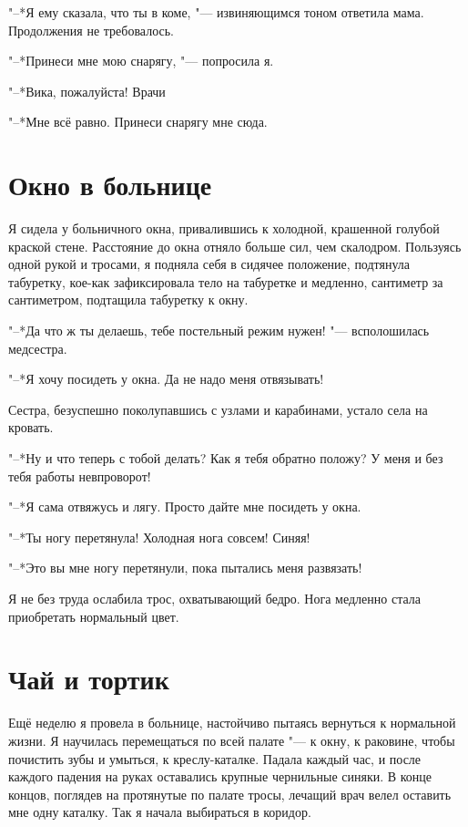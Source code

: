 "--*Я ему сказала, что ты в коме, "--- извиняющимся тоном ответила мама.
Продолжения не требовалось.

"--*Принеси мне мою снарягу, "--- попросила я.

"--*Вика, пожалуйста!
Врачи\ldotst

"--*Мне всё равно.
Принеси снарягу мне сюда.

\section{Окно в больнице}

Я сидела у больничного окна, привалившись к холодной, крашенной голубой краской стене.
Расстояние до окна отняло больше сил, чем скалодром.
Пользуясь одной рукой и тросами, я подняла себя в сидячее положение, подтянула табуретку, кое-как зафиксировала тело на табуретке и медленно, сантиметр за сантиметром, подтащила табуретку к окну.

"--*Да что ж ты делаешь, тебе постельный режим нужен! "--- всполошилась медсестра.

"--*Я хочу посидеть у окна.
Да не надо меня отвязывать!

Сестра, безуспешно поколупавшись с узлами и карабинами, устало села на кровать.

"--*Ну и что теперь с тобой делать?
Как я тебя обратно положу?
У меня и без тебя работы невпроворот!

"--*Я сама отвяжусь и лягу.
Просто дайте мне посидеть у окна.

"--*Ты ногу перетянула!
Холодная нога совсем!
Синяя!

"--*Это вы мне ногу перетянули, пока пытались меня развязать!

Я не без труда ослабила трос, охватывающий бедро.
Нога медленно стала приобретать нормальный цвет.

\section{Чай и тортик}

Ещё неделю я провела в больнице, настойчиво пытаясь вернуться к нормальной жизни.
Я научилась перемещаться по всей палате "--- к окну, к раковине, чтобы почистить зубы и умыться, к креслу-каталке.
Падала каждый час, и после каждого падения на руках оставались крупные чернильные синяки.
В конце концов, поглядев на протянутые по палате тросы, лечащий врач велел оставить мне одну каталку.
Так я начала выбираться в коридор.

